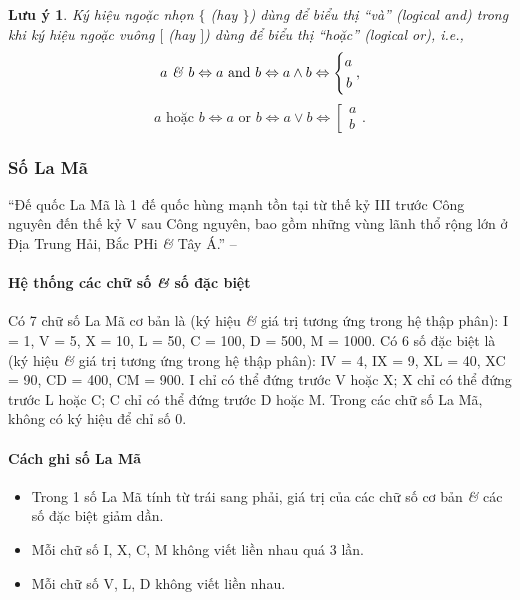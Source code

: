 \documentclass{article}
\numberwithin{equation}{section}
\newtheorem{luuy}{Lưu ý}[section]
\begin{document}
\begin{luuy}
	Ký hiệu ngoặc nhọn $\{$ (hay $\}$) dùng để biểu thị ``và'' (logical and) trong khi ký hiệu ngoặc vuông $[$ (hay $]$) dùng để biểu thị ``hoặc'' (logical or), i.e.,
	\begin{equation*}
		a\mbox{ \textit{\&} } b\Leftrightarrow a\mbox{ and } b\Leftrightarrow a\land b\Leftrightarrow\left\{\begin{split}
			a\\b
		\end{split}\right.,	
	\end{equation*}
	\begin{equation*}
		a\mbox{ hoặc } b\Leftrightarrow a\mbox{ or } b\Leftrightarrow a\lor b\Leftrightarrow\left[\begin{split}
			a\\b
		\end{split}\right..
	\end{equation*}
\end{luuy}

\subsubsection{Số La Mã}
``Đế quốc La Mã là 1 đế quốc hùng mạnh tồn tại từ thế kỷ III trước Công nguyên đến thế kỷ V sau Công nguyên, bao gồm những vùng lãnh thổ rộng lớn ở Địa Trung Hải, Bắc PHi \textit{\&} Tây Á.'' -- \cite[p. 14]{SGK_Toan_6_Canh_Dieu_tap_1}

\paragraph{Hệ thống các chữ số \textit{\&} số đặc biệt}
Có 7 chữ số La Mã cơ bản là (ký hiệu \textit{\&} giá trị tương ứng trong hệ thập phân): I = 1, V = 5, X = 10, L = 50, C = 100, D = 500, M = 1000. Có 6 số đặc biệt là (ký hiệu \textit{\&} giá trị tương ứng trong hệ thập phân): IV = 4, IX = 9, XL = 40, XC = 90, CD = 400, CM = 900. I chỉ có thể đứng trước V hoặc X; X chỉ có thể đứng trước L hoặc C; C chỉ có thể đứng trước D hoặc M. Trong các chữ số La Mã, không có ký hiệu để chỉ số 0.

\paragraph{Cách ghi số La Mã}
\begin{itemize}
	\item Trong 1 số La Mã tính từ trái sang phải, giá trị của các chữ số cơ bản \textit{\&} các số đặc biệt giảm dần.
	\item Mỗi chữ số I, X, C, M không viết liền nhau quá 3 lần.
	\item Mỗi chữ số V, L, D không viết liền nhau.
\end{itemize}
\end{document}
